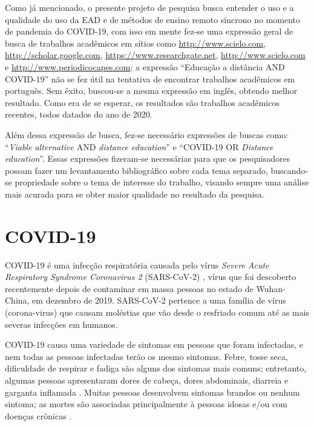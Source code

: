 \documentclass[
	arial,
	12pt,				%
	openright,			%
	oneside,
	a4paper,			%
	chapter=TITLE,		%
	english,			%
	french,				%
	spanish,			%
	brazil,				%
	]{abntex2}
\begin{document}
Como já mencionado, o presente projeto de pesquisa busca entender o uso e a qualidade do uso da EAD e de métodos de ensino remoto síncrono no momento de pandemia do COVID-19, com isso em mente fez-se uma expressão geral de busca de trabalhos acadêmicos em sítios como \url{http://www.scielo.com}, \url{http://scholar.google.com}, \url{https://www.researchgate.net}, \url{http://www.scielo.com} e \url{http://www.periodicocapes.com}; a expressão ``Educação a distância AND COVID-19'' não se fez útil na tentativa de encontrar trabalhos acadêmicos em português. Sem êxito, buscou-se a mesma expressão em inglês, obtendo melhor resultado. Como era de se esperar, os resultados são trabalhos acadêmicos recentes, todos datados do ano de 2020.  

Além dessa expressão de busca, fez-se necessário expressões de buscas como: ``\textit{Viable alternative} AND \textit{distance education}'' e ``COVID-19 OR \textit{Distance education}''. Essas expressões fizeram-se necessárias para que os pesquisadores possam fazer um levantamento bibliográfico sobre cada tema separado, buscando-se propriedade sobre o tema de interesse do trabalho, visando sempre uma análise mais acurada para se obter maior qualidade no resultado da pesquisa.

\section{COVID-19}

COVID-19 é uma infecção respiratória causada pelo vírus \textit{Severe Acute Respiratory Syndrome Coronavirus 2} (SARS-CoV-2) \cite{desai2020stopping}, vírus que foi descoberto recentemente depois de contaminar em massa pessoas no estado de Wuhan-China, em dezembro de 2019. SARS-CoV-2 pertence a uma família de vírus (corona-virus) que causam moléstias que vão desde o resfriado comum até as mais severas infecções em humanos.

COVID-19 causa uma variedade de sintomas em pessoas que foram infectadas, e nem todas as pessoas infectadas terão os mesmo sintomas. Febre, tosse seca, dificuldade de respirar e fadiga são alguns dos sintomas mais comuns; entretanto, algumas pessoas apresentaram dores de cabeça, dores abdominais, diarreia e garganta inflamada \cite{desai2020stopping}. Muitas pessoas desenvolvem sintomas brandos ou nenhum sintoma; as mortes são associadas principalmente à pessoas idosas e/ou com doenças crônicas \cite{watkins2020preventing}. 
\end{document}
